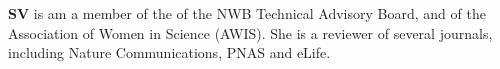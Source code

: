 \textbf{SV} is am a member of the of the NWB Technical Advisory Board, and of the Association of Women in Science (AWIS).  She is a reviewer of several journals, including Nature Communications, PNAS and eLife.
